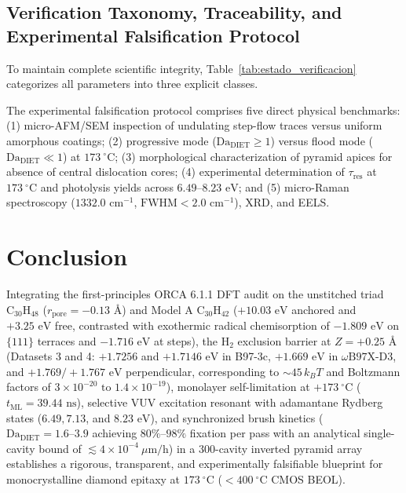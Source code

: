 \documentclass[10pt,twocolumn,a4paper]{article}
\begin{document}
\begin{enumerate}
\end{enumerate}

\subsection{Verification Taxonomy, Traceability, and Experimental Falsification Protocol}\label{sec:verif}
To maintain complete scientific integrity, Table~\ref{tab:estado_verificacion} categorizes all parameters into three explicit classes.

The experimental falsification protocol comprises five direct physical benchmarks:
(1) micro-AFM/SEM inspection of undulating step-flow traces versus uniform amorphous coatings;
(2) progressive mode ($\text{Da}_{\text{DIET}} \ge 1$) versus flood mode ($\text{Da}_{\text{DIET}} \ll 1$) at $173\ ^\circ\text{C}$;
(3) morphological characterization of pyramid apices for absence of central dislocation cores;
(4) experimental determination of $\tau_{\text{res}}$ at $173\ ^\circ\text{C}$ and photolysis yields across $6.49\text{--}8.23\text{ eV}$; and
(5) micro-Raman spectroscopy ($1332.0\text{ cm}^{-1}$, $\text{FWHM} < 2.0\text{ cm}^{-1}$), XRD, and EELS.

\section{Conclusion}
Integrating the first-principles ORCA 6.1.1 DFT audit on the unstitched triad $\text{C}_{30}\text{H}_{48}$ ($r_{\text{pore}} = -0.13\text{ \AA}$) and Model A $\text{C}_{30}\text{H}_{42}$ ($+10.03\text{ eV}$ anchored and $+3.25\text{ eV}$ free, contrasted with exothermic radical chemisorption of $-1.809\text{ eV}$ on $\{111\}$ terraces and $-1.716\text{ eV}$ at steps), the $\text{H}_2$ exclusion barrier at $Z = +0.25\text{ \AA}$ (Datasets 3 and 4: $+1.7256$ and $+1.7146\text{ eV}$ in B97-3c, $+1.669\text{ eV}$ in $\omega\text{B97X-D3}$, and $+1.769 / +1.767\text{ eV}$ perpendicular, corresponding to $\sim 45\,k_B T$ and Boltzmann factors of $3 \times 10^{-20}\text{ to }1.4 \times 10^{-19}$), monolayer self-limitation at $+173\ ^\circ\text{C}$ ($t_{\text{ML}} = 39.44\text{ ns}$), selective VUV excitation resonant with adamantane Rydberg states ($6.49, 7.13$, and $8.23\text{ eV}$), and synchronized brush kinetics ($\text{Da}_{\text{DIET}} = 1.6\text{--}3.9$ achieving $80\%\text{--}98\%$ fixation per pass with an analytical single-cavity bound of $\lesssim 4 \times 10^{-4}\ \mu\text{m/h}$) in a $300$-cavity inverted pyramid array establishes a rigorous, transparent, and experimentally falsifiable blueprint for monocrystalline diamond epitaxy at $173\ ^\circ\text{C}$ ($<400\ ^\circ\text{C}$ CMOS BEOL).
\end{document}
